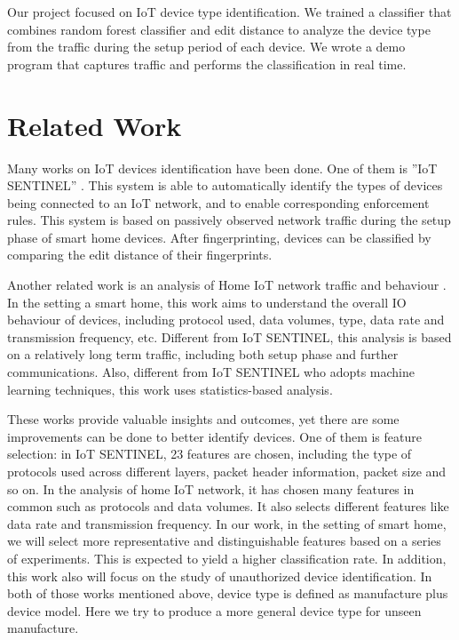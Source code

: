 \documentclass[twocolumn,10pt]{article}
\begin{document}
Our project focused on IoT device type identification. We trained a classifier that combines random forest classifier and edit distance to analyze the device type from the traffic during the setup period of each device. We wrote a demo program that captures traffic and performs the classification in real time.

\section{Related Work}

Many works on IoT devices identification have been done. One of them is ”IoT SENTINEL” \cite{miettinen2017iot}. This system is able to automatically identify the types of devices being connected to an IoT network, and to enable corresponding enforcement rules. This system is based on passively observed network traffic during the setup phase of smart home devices. After fingerprinting, devices can be classified by comparing the edit distance of their fingerprints.

Another related work is an analysis of Home IoT network traffic and behaviour \cite{amar2018analysis} . In the setting a smart home, this work aims to understand the overall IO behaviour of devices, including protocol used, data volumes, type, data rate and transmission frequency, etc. Different from IoT SENTINEL, this analysis is based on a relatively long term traffic, including both setup phase and further communications. Also, different from IoT SENTINEL who adopts machine learning techniques, this work uses statistics-based analysis.

These works provide valuable insights and outcomes, yet there are some improvements can be done to better identify devices. One of them is feature selection: in IoT SENTINEL, 23 features are chosen, including the type of protocols used across different layers, packet header information, packet size and so on. In the analysis of home IoT network, it has chosen many features in common such as protocols and data volumes. It also selects different features like data rate and transmission frequency. In our work, in the setting of smart home, we will select more representative and distinguishable features based on a series of experiments. This is expected to yield a higher classification rate. In addition, this work also will focus on the study of unauthorized device identification. In both of those works mentioned above, device type is defined as manufacture plus device model. Here we try to produce a more general device type for unseen manufacture.
\end{document}
